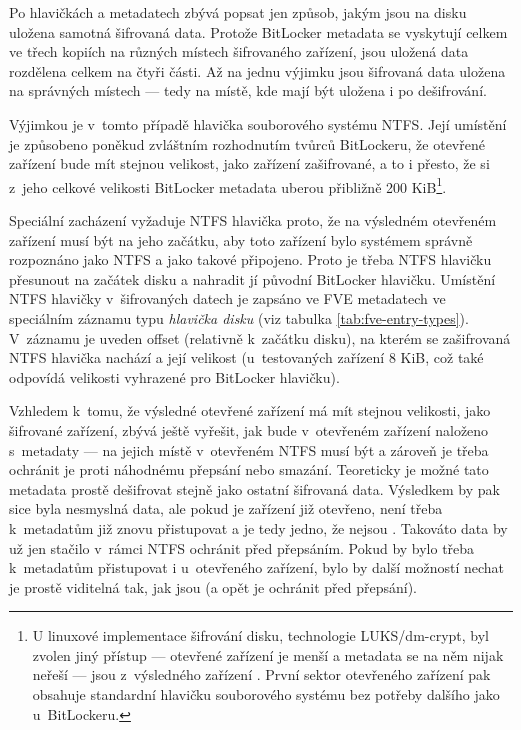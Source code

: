 Po hlavičkách a metadatech zbývá popsat jen způsob, jakým jsou na disku uložena samotná šifrovaná data. Protože BitLocker metadata se vyskytují celkem ve třech kopiích na různých místech  šifrovaného zařízení, jsou uložená data rozdělena celkem na čtyři části. Až na jednu výjimku jsou šifrovaná data uložena na správných místech --- tedy na místě, kde mají být uložena i po dešifrování.

Výjimkou je v~tomto případě hlavička souborového systému NTFS. Její umístění je způsobeno poněkud zvláštním rozhodnutím tvůrců BitLockeru, že otevřené zařízení bude mít stejnou velikost, jako zařízení zašifrované, a to i přesto, že si z~jeho celkové velikosti BitLocker metadata uberou přibližně 200 KiB\footnote{U linuxové implementace šifrování disku, technologie LUKS/dm-crypt, byl zvolen jiný přístup --- otevřené zařízení je menší a metadata se na něm nijak neřeší --- jsou z~výsledného zařízení . První sektor otevřeného zařízení pak obsahuje standardní hlavičku souborového systému bez potřeby dalšího  jako u~BitLockeru.}.


Speciální zacházení vyžaduje NTFS hlavička proto, že na výsledném otevřeném zařízení musí být na jeho začátku, aby toto zařízení bylo systémem správně rozpoznáno jako NTFS a jako takové připojeno. Proto je třeba NTFS hlavičku přesunout na začátek disku a nahradit jí původní BitLocker hlavičku. Umístění NTFS hlavičky v~šifrovaných datech je zapsáno ve FVE metadatech ve speciálním záznamu typu \emph{hlavička disku} (viz tabulka \ref{tab:fve-entry-types}). V~záznamu je uveden offset (relativně k~začátku disku), na kterém se zašifrovaná NTFS hlavička nachází a její velikost (u~testovaných zařízení 8 KiB, což také odpovídá velikosti vyhrazené pro BitLocker hlavičku).

Vzhledem k~tomu, že výsledné otevřené zařízení má mít stejnou velikosti, jako šifrované zařízení, zbývá ještě vyřešit, jak bude v~otevřeném zařízení naloženo s~metadaty --- na jejich místě v~otevřeném NTFS musí  být a zároveň je třeba ochránit je proti náhodnému přepsání nebo smazání. Teoreticky je možné tato metadata prostě dešifrovat stejně jako ostatní šifrovaná data. Výsledkem by pak sice byla nesmyslná data, ale pokud je zařízení již otevřeno, není třeba k~metadatům již znovu přistupovat a je tedy jedno, že nejsou . Takováto  data by už jen stačilo v~rámci NTFS ochránit před přepsáním. Pokud by bylo třeba k~metadatům přistupovat i u~otevřeného zařízení, bylo by další možností nechat je prostě viditelná tak, jak jsou (a opět je ochránit před přepsání).

